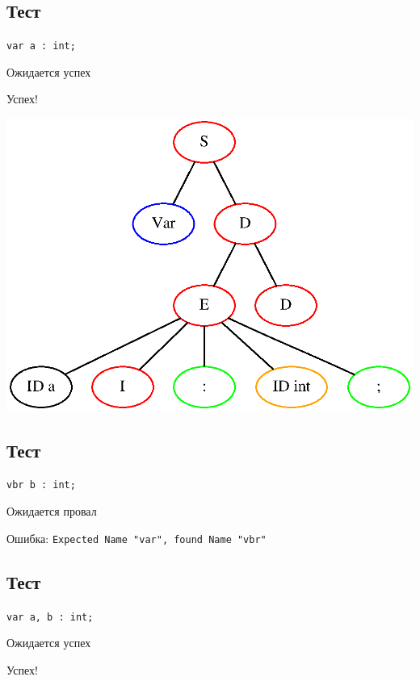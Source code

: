 \subsection{Тест }

\texttt{var a : int;}

Ожидается успех

Успех! 

\includegraphics[width=\textwidth]{test1.eps}

\subsection{Тест }

\texttt{vbr b : int;}

Ожидается провал

Ошибка: \texttt{Expected Name "var", found Name "vbr"}

\subsection{Тест }

\texttt{var a, b : int;}

Ожидается успех

Успех! 

